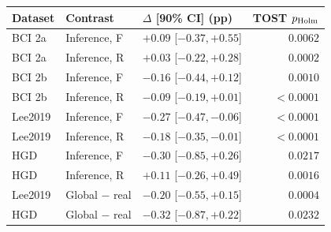 \begin{tabular}{@{}lllr@{}}
\toprule
Dataset & Contrast & $\Delta$ [90\% CI] (pp) & TOST $p_{\rm Holm}$ \\
\midrule
BCI 2a & Inference, F & $+0.09$ [$ -0.37, +0.55 $] & $0.0062$ \\
BCI 2a & Inference, R & $+0.03$ [$ -0.22, +0.28 $] & $0.0002$ \\
BCI 2b & Inference, F & $-0.16$ [$ -0.44, +0.12 $] & $0.0010$ \\
BCI 2b & Inference, R & $-0.09$ [$ -0.19, +0.01 $] & $<0.0001$ \\
Lee2019 & Inference, F & $-0.27$ [$ -0.47, -0.06 $] & $<0.0001$ \\
Lee2019 & Inference, R & $-0.18$ [$ -0.35, -0.01 $] & $<0.0001$ \\
HGD & Inference, F & $-0.30$ [$ -0.85, +0.26 $] & $0.0217$ \\
HGD & Inference, R & $+0.11$ [$ -0.26, +0.49 $] & $0.0016$ \\
Lee2019 & Global $-$ real & $-0.20$ [$ -0.55, +0.15 $] & $0.0004$ \\
HGD & Global $-$ real & $-0.32$ [$ -0.87, +0.22 $] & $0.0232$ \\
\bottomrule
\end{tabular}
